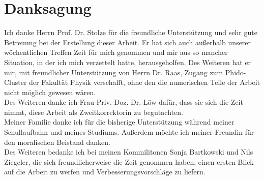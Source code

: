 \chapter*{Danksagung}
Ich danke Herrn Prof. Dr. Stolze für die freundliche Unterstützung und sehr gute Betreuung bei der Erstellung dieser Arbeit. Er hat sich auch außerhalb unserer wöchentlichen Treffen Zeit für mich genommen und mir aus so mancher Situation, in der ich mich verzettelt hatte, herausgeholfen. Des Weiteren hat er mir, mit freundlicher Unterstützung von Herrn Dr. Raas, Zugang zum Phido-Cluster der Fakultät Physik verschafft, ohne den die numerischen Teile der Arbeit nicht möglich gewesen wären.\\
Des Weiteren danke ich Frau Priv.-Doz. Dr. Löw dafür, dass sie sich die Zeit nimmt, diese Arbeit als Zweitkorrektorin zu begutachten. \\
Meiner Familie danke ich für die bisherige Unterstützung während meiner Schullaufbahn und meines Studiums. Außerdem möchte ich meiner Freundin für den moralischen Beistand danken. \\
Des Weiteren bedanke ich bei meinen Kommilitonen Sonja Bartkowski und Nils Ziegeler, die sich freundlicherweise die Zeit genommen haben, einen ersten Blick auf die Arbeit zu werfen und Verbesserungsvorschläge zu liefern.
\thispagestyle{empty}
